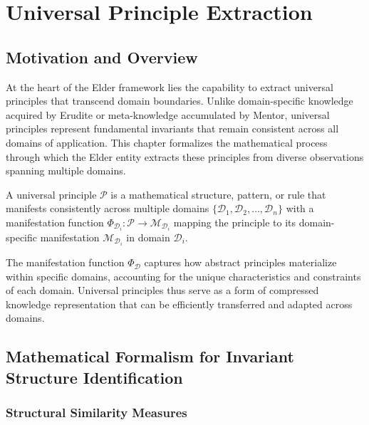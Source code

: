 \chapter{Universal Principle Extraction}

\section{Motivation and Overview}

At the heart of the Elder framework lies the capability to extract universal principles that transcend domain boundaries. Unlike domain-specific knowledge acquired by Erudite or meta-knowledge accumulated by Mentor, universal principles represent fundamental invariants that remain consistent across all domains of application. This chapter formalizes the mathematical process through which the Elder entity extracts these principles from diverse observations spanning multiple domains.

\begin{definition}
A universal principle $\mathcal{P}$ is a mathematical structure, pattern, or rule that manifests consistently across multiple domains $\{\mathcal{D}_1, \mathcal{D}_2, \ldots, \mathcal{D}_n\}$ with a manifestation function $\Phi_{\mathcal{D}_i}: \mathcal{P} \rightarrow \mathcal{M}_{\mathcal{D}_i}$ mapping the principle to its domain-specific manifestation $\mathcal{M}_{\mathcal{D}_i}$ in domain $\mathcal{D}_i$.
\end{definition}

The manifestation function $\Phi_{\mathcal{D}}$ captures how abstract principles materialize within specific domains, accounting for the unique characteristics and constraints of each domain. Universal principles thus serve as a form of compressed knowledge representation that can be efficiently transferred and adapted across domains.

\section{Mathematical Formalism for Invariant Structure Identification}



\subsection{Structural Similarity Measures}


